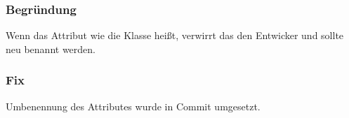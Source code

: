         \subsubsection{Begründung}
        Wenn das Attribut wie die Klasse heißt, verwirrt das den Entwicker und sollte neu benannt werden.
        \subsubsection{Fix}
        Umbenennung des Attributes wurde in Commit  umgesetzt.